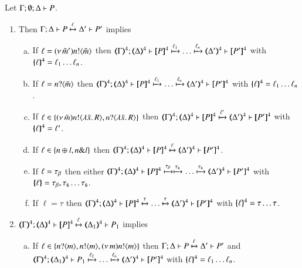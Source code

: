 \begin{proposition}\myrm
	\label{app:prop:op_corr_pHOp_to_HOp}
%
Let $\Gamma; \emptyset; \Delta \vdash P$.
	\begin{enumerate}
		\item	 Then
			$\Gamma; \Delta \vdash P \xmapsto{\ell} \Delta' \vdash P'$ implies
%
			\begin{enumerate}[a)]
				\item	If $\ell = (\nu\, \tilde{m}') n ! \langle \tilde{m} \rangle$ then
					$\horel{\tmap{\Gamma}{4}}{\tmap{\Delta}{4}}{\pmap{P}{4}}{\hby{\ell_1} \dots \hby{\ell_n}}{\tmap{\Delta'}{4}}{\pmap{P'}{4}}$
					with $\{\!\!\{\ell\}\!\!\}^{4} = \ell_1 \dots \ell_n$.

				\item	If $\ell = n ? \langle \tilde{m} \rangle$ then
					$\horel{\tmap{\Gamma}{4}}{\tmap{\Delta}{4}}{\pmap{P}{4}}{\hby{\ell_1} \dots \hby{\ell_n}}{\tmap{\Delta'}{4}}{\pmap{P'}{4}}$
					with $\{\!\!\{\ell\}\!\!\}^{4} = \ell_1 \dots \ell_n$.

				\item	If $\ell \in \{(\nu\, \tilde{m}) n ! \langle \lambda \tilde{x}.\,R \rangle, n ? \langle \lambda \tilde{x}.\,R \rangle\}$ then
					$\horel{\tmap{\Gamma}{4}}{\tmap{\Delta}{4}}{\pmap{P}{4}}{\hby{\ell'}}
					{\tmap{\Delta'}{4}}{\pmap{P'}{4}}$ with $\{\!\!\{\ell\}\!\!\}^{4} = \ell'$.

				\item	If $\ell \in \{n \oplus l, n \& l\}$ then
					$\horel{\tmap{\Gamma}{4}}{\tmap{\Delta}{4}}{\pmap{P}{4}}{\hby{\ell}}
					{\tmap{\Delta'}{4}}{\pmap{P'}{4}}$.

				\item	If $\ell = \tau_{\beta}$ then either
					$\horel{\tmap{\Gamma}{4}}{\tmap{\Delta}{4}}{\pmap{P}{4}}{\hby{\btau} \hby{\stau} \dots \hby{\stau}}
					{\tmap{\Delta'}{4}}{\pmap{P'}{4}}$ with $\{\!\!\{\ell\}\!\!\} = \tau_{\beta}, \tau_{\mathsf{s}} \dots \tau_{\mathsf{s}}$.

				\item	If $\ell = \tau$ then %
					$\horel{\tmap{\Gamma}{4}}{\tmap{\Delta}{4}}{\pmap{P}{4}}{\hby{\tau} \dots \hby{\tau}}
					{\tmap{\Delta'}{4}}{\pmap{P'}{4}}$ with $\{\!\!\{\ell\}\!\!\}^{4} = \tau \dots \tau$.
			\end{enumerate}

		\item	%
			$\horel{\tmap{\Gamma}{4}}{\tmap{\Delta}{4}}{\pmap{P}{4}}{\hby{\ell}}
			{\tmap{\Delta_1}{4}}{P_1}$ implies
%
			\begin{enumerate}[a)]
				\item	If $\ell \in \{n ? \langle m \rangle, n ! \langle m \rangle, (\nu\, m) n ! \langle m \rangle\}$ then
					$\Gamma; \Delta \vdash P \xmapsto{\ell} \Delta' \vdash P'$ and\\
					$\horel{\tmap{\Gamma}{4}}{\tmap{\Delta_1}{4}}{P_1}{\hby{\ell_2} \dots \hby{\ell_n}}
					{\tmap{\Delta'}{4}}{\pmap{P'}{4}}$ with $\{\!\!\{\ell\}\!\!\}^{4} = \ell_1 \dots \ell_n$.


\end{enumerate}
\end{enumerate}
\end{proposition}
